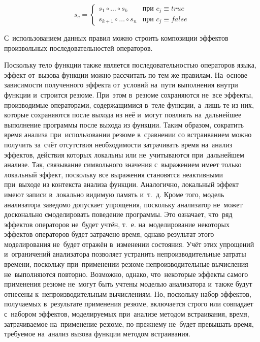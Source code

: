\begin{equation}
    s_c  =
     \left\{
    \begin{matrix}
    s_1 \circ \ldots \circ s_k & \text{при } c_j \equiv true \\
    s_{k+1} \circ \ldots \circ s_n & \text{при } c_j \equiv false
    \end{matrix} \right.
\end{equation}

С~использованием данных правил можно строить композиции эффектов произвольных последовательностей операторов.

Поскольку тело функции также является последовательностью операторов языка, эффект от~вызова функции можно рассчитать по тем же правилам. На~основе зависимости полученного эффекта от~условий на~пути выполнения внутри функции и~строится резюме. При~этом в~резюме сохраняются не~все эффекты, производимые операторами, содержащимися в~теле функции, а~лишь те из них, которые сохраняются после выхода из неё и~могут повлиять на~дальнейшее выполнение программы после выхода из функции. Таким образом, сократить время анализа при~использовании резюме в~сравнении со встраиванием можно получить за~счёт отсутствия необходимости затрачивать время на~анализ эффектов, действия которых локальны или не~учитываются при~дальнейшем анализе. Так, связывание символьного значения с~выражением имеет только локальный эффект, поскольку все выражения становятся неактивными при~выходе из контекста анализа функции. Аналогично, локальный эффект имеют записи в~локально видимую память и~т.~д. Кроме того, модель анализатора заведомо допускает упрощения, поскольку анализатор не~может досконально смоделировать поведение программы. Это означает, что~ряд эффектов операторов не~будет учтён, т.~е. на~моделирование некоторых эффектов операторов будет затрачено время, однако результат этого моделирования не~будет отражён в~изменении состояния. Учёт этих упрощений и~ограничений анализатора позволяет устранить непроизводительные затраты времени, поскольку при~применении резюме непроизводительные вычисления не~выполняются повторно. Возможно, однако, что~некоторые эффекты самого применения резюме не~могут быть учтены моделью анализатора и~также будут отнесены к~непроизводительным вычислениям. Но, поскольку набор эффектов, получаемых в~результате применения резюме, включается строго или совпадает с~набором эффектов, моделируемых при~анализе методом встраивания, время, затрачиваемое на~применение резюме, по-прежнему не~будет превышать время, требуемое на~анализ вызова функции методом встраивания.

